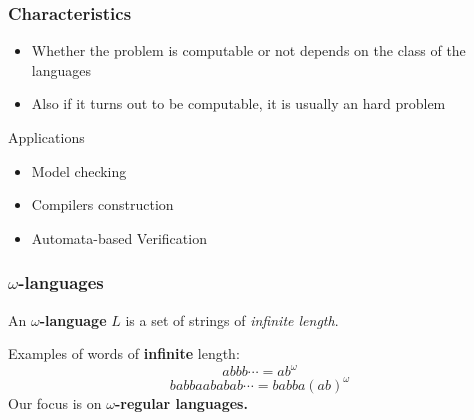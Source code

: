 \documentclass{beamer}
\begin{document}
\begin{frame}
\frametitle{Characteristics}

\begin{itemize}
\item Whether the problem is computable or not depends on the class of the languages
\item Also if it turns out to be computable, it is usually an hard problem
\end{itemize}

Applications
\begin{itemize}
\item Model checking
\item Compilers construction
\item Automata-based Verification
\end{itemize}
\end{frame}

\begin{frame}
\frametitle{$\omega$-languages}
\begin{definition}
An \textbf{$\omega$-language} $L$ is a set of strings of \emph{infinite length}.
\end{definition}

Examples of words of \textbf{infinite} length:
\[ abbb\cdots = ab^{\omega} \]
\[ babbaababab\cdots = babba(ab)^{\omega} \]
\pause
Our focus is on $\omega$\textbf{-regular languages.}
\end{frame}
\end{document}
